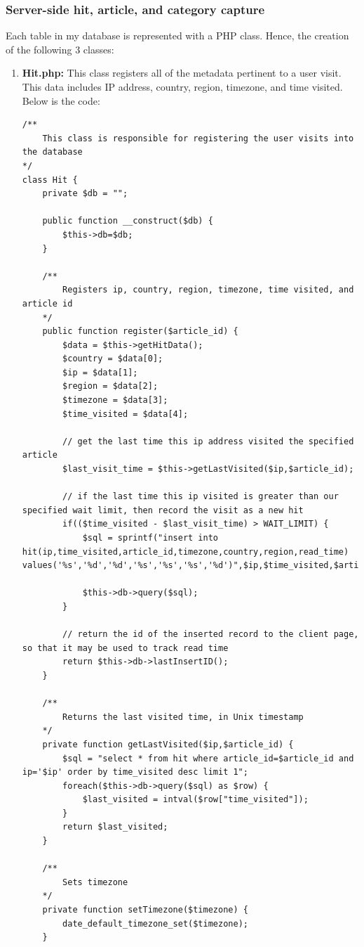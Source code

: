 \documentclass[12pt]{article}
\begin{document}
\subsubsection{Server-side hit, article, and category capture}
Each table in my database is represented with a PHP class. Hence, the creation of the following 3 classes:
\begin{enumerate}
\item{\textbf{Hit.php:}} This class registers all of the metadata pertinent to a user visit. This data includes IP address, country, region, timezone, and time visited. Below is the code:
\begin{lstlisting}[basicstyle=\tiny]
/**
	This class is responsible for registering the user visits into the database
*/
class Hit {
	private $db = "";
	
	public function __construct($db) {
		$this->db=$db;
	}
	
	/**
		Registers ip, country, region, timezone, time visited, and article id
	*/
	public function register($article_id) {
		$data = $this->getHitData();
		$country = $data[0];
		$ip = $data[1];
		$region = $data[2];
		$timezone = $data[3];
		$time_visited = $data[4];
		
		// get the last time this ip address visited the specified article
		$last_visit_time = $this->getLastVisited($ip,$article_id);

		// if the last time this ip visited is greater than our specified wait limit, then record the visit as a new hit
		if(($time_visited - $last_visit_time) > WAIT_LIMIT) {
			$sql = sprintf("insert into hit(ip,time_visited,article_id,timezone,country,region,read_time) values('%s','%d','%d','%s','%s','%s','%d')",$ip,$time_visited,$article_id,$timezone,$country,$region,$read_time);

			$this->db->query($sql);	
		}
		
		// return the id of the inserted record to the client page, so that it may be used to track read time
		return $this->db->lastInsertID();
	}
	
	/**
		Returns the last visited time, in Unix timestamp
	*/
	private function getLastVisited($ip,$article_id) {
		$sql = "select * from hit where article_id=$article_id and ip='$ip' order by time_visited desc limit 1";
		foreach($this->db->query($sql) as $row) {
			$last_visited = intval($row["time_visited"]);
		}
		return $last_visited;
	}
	
	/**
		Sets timezone
	*/
	private function setTimezone($timezone) {
		date_default_timezone_set($timezone);
	}
	

\end{lstlisting}
\end{enumerate}
\end{document}
